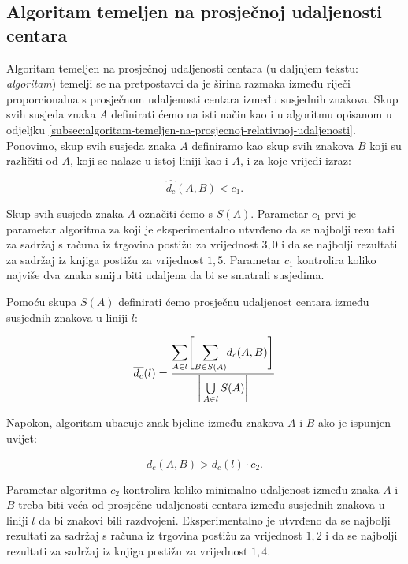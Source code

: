 \documentclass[times, utf8, zavrsni]{fer}
\begin{document}
\subsection{Algoritam temeljen na prosječnoj udaljenosti centara}
\label{subsec:algoritam-temeljen-na-prosjecnoj-udaljenosti-centara}
Algoritam temeljen na prosječnoj udaljenosti centara (u daljnjem tekstu:
\emph{algoritam}) temelji se na pretpostavci da je širina razmaka između riječi
proporcionalna s prosječnom udaljenosti centara između susjednih znakova.
Skup svih susjeda znaka $A$ definirati ćemo na isti način kao i u algoritmu
opisanom u odjeljku
\ref{subsec:algoritam-temeljen-na-prosjecnoj-relativnoj-udaljenosti}. Ponovimo,
skup svih susjeda znaka $A$ definiramo kao skup svih znakova $B$ koji su
različiti od $A$, koji se nalaze u istoj liniji kao i $A$, i za koje vrijedi
izraz:

\begin{equation}
\hat{d_c}(A, B) < c_1 \texttt{.}
\end{equation}

Skup svih susjeda znaka $A$ označiti ćemo s $S(A)$. Parametar $c_1$ prvi je
parametar algoritma za koji je eksperimentalno utvrđeno
da se najbolji rezultati za sadržaj s računa iz trgovina postižu za vrijednost
$3{,}0$ i da se najbolji rezultati za sadržaj iz knjiga postižu za vrijednost
$1{,}5$. Parametar $c_1$ kontrolira koliko najviše dva znaka smiju biti udaljena
da bi se smatrali susjedima.

Pomoću skupa $S(A)$ definirati ćemo prosječnu udaljenost centara između
susjednih znakova u liniji $l$:

\begin{equation}
\overline{d_c}(l) =
\frac{
    \mathlarger{\sum}\limits_{A \in l}
    \Bigg[
    \mathlarger{\sum}\limits_{B \in S(A)} d_c(A, B)
    \Bigg]
}
{\bigg|\bigcup\limits_{A \in l} S(A)\bigg|}
\end{equation}

Napokon, algoritam ubacuje znak bjeline između znakova $A$ i $B$ ako je ispunjen
uvijet:

\begin{equation}
d_c(A, B) > \overline{d_c}(l) \cdot c_2 \texttt{.}
\end{equation}

Parametar algoritma $c_2$ kontrolira koliko minimalno udaljenost između znaka
$A$ i $B$ treba biti veća od prosječne udaljenosti centara između susjednih
znakova u liniji $l$ da bi znakovi bili razdvojeni. Eksperimentalno je utvrđeno
da se najbolji rezultati za sadržaj s računa iz trgovina postižu za vrijednost
$1{,}2$ i da se najbolji rezultati za sadržaj iz knjiga postižu za vrijednost
$1{,}4$.
\end{document}
